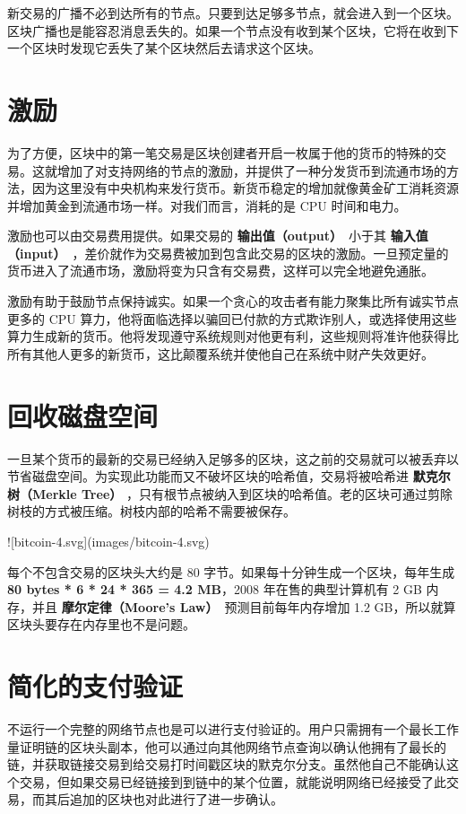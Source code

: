 \documentclass{article}
\begin{document}
新交易的广播不必到达所有的节点。只要到达足够多节点，就会进入到一个区块。区块广播也是能容忍消息丢失的。如果一个节点没有收到某个区块，它将在收到下一个区块时发现它丢失了某个区块然后去请求这个区块。

\section{激励}
为了方便，区块中的第一笔交易是区块创建者开启一枚属于他的货币的特殊的交易。这就增加了对支持网络的节点的激励，并提供了一种分发货币到流通市场的方法，因为这里没有中央机构来发行货币。新货币稳定的增加就像黄金矿工消耗资源并增加黄金到流通市场一样。对我们而言，消耗的是 CPU 时间和电力。

激励也可以由交易费用提供。如果交易的 \textbf{输出值（output）}\ 小于其 \textbf{输入值（input）}\ ，差价就作为交易费被加到包含此交易的区块的激励。一旦预定量的货币进入了流通市场，激励将变为只含有交易费，这样可以完全地避免通胀。

激励有助于鼓励节点保持诚实。如果一个贪心的攻击者有能力聚集比所有诚实节点更多的 CPU 算力，他将面临选择以骗回已付款的方式欺诈别人，或选择使用这些算力生成新的货币。他将发现遵守系统规则对他更有利，这些规则将准许他获得比所有其他人更多的新货币，这比颠覆系统并使他自己在系统中财产失效更好。

\section{回收磁盘空间}
一旦某个货币的最新的交易已经纳入足够多的区块，这之前的交易就可以被丢弃以节省磁盘空间。为实现此功能而又不破坏区块的哈希值，交易将被哈希进 \textbf{默克尔树（Merkle Tree）} \cite{Merkle}\cite{Massias}\cite{Stornetta}，只有根节点被纳入到区块的哈希值。老的区块可通过剪除树枝的方式被压缩。树枝内部的哈希不需要被保存。

![bitcoin-4.svg](images/bitcoin-4.svg)

每个不包含交易的区块头大约是 80 字节。如果每十分钟生成一个区块，每年生成 \textbf{80 bytes * 6 * 24 * 365 = 4.2 MB}，2008 年在售的典型计算机有 2 GB 内存，并且 \textbf{摩尔定律（Moore's Law）}\ 预测目前每年内存增加 1.2 GB，所以就算区块头要存在内存里也不是问题。

\section{简化的支付验证}
不运行一个完整的网络节点也是可以进行支付验证的。用户只需拥有一个最长工作量证明链的区块头副本，他可以通过向其他网络节点查询以确认他拥有了最长的链，并获取链接交易到给交易打时间戳区块的默克尔分支。虽然他自己不能确认这个交易，但如果交易已经链接到到链中的某个位置，就能说明网络已经接受了此交易，而其后追加的区块也对此进行了进一步确认。
\end{document}
